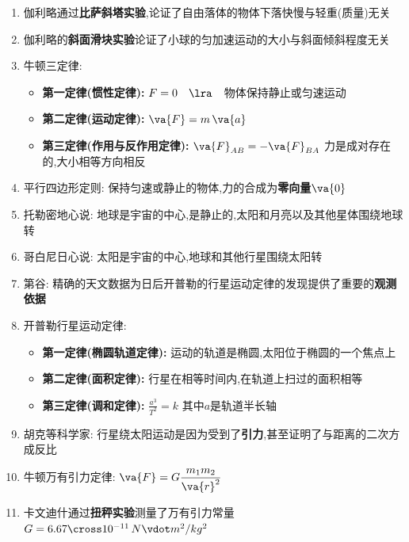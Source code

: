 \documentclass{article}
\begin{document}
\begin{itemize}
\begin{enumerate}
              \item 伽利略通过\textbf{比萨斜塔实验},论证了自由落体的物体下落快慢与轻重(质量)无关
              \item 伽利略的\textbf{斜面滑块实验}论证了小球的匀加速运动的大小与斜面倾斜程度无关
              \item 牛顿三定律:
                    \begin{itemize}
                        \item \textbf{第一定律(惯性定律):} $ F = 0 \quad \lra \quad $物体保持静止或匀速运动
                        \item \textbf{第二定律(运动定律):} $ \va{F} = m \, \va{a} $
                        \item \textbf{第三定律(作用与反作用定律):} $ \va{F}_{AB} = - \va{F}_{BA} $ 力是成对存在的,大小相等方向相反
                    \end{itemize}
              \item 平行四边形定则: 保持匀速或静止的物体,力的合成为\textbf{零向量$\va{0}$}
              \item 托勒密地心说: 地球是宇宙的中心,是静止的,太阳和月亮以及其他星体围绕地球转
              \item 哥白尼日心说: 太阳是宇宙的中心,地球和其他行星围绕太阳转
              \item 第谷: 精确的天文数据为日后开普勒的行星运动定律的发现提供了重要的\textbf{观测依据}
              \item 开普勒行星运动定律:
                    \begin{itemize}
                        \item \textbf{第一定律(椭圆轨道定律):} 运动的轨道是椭圆,太阳位于椭圆的一个焦点上
                        \item \textbf{第二定律(面积定律):} 行星在相等时间内,在轨道上扫过的面积相等
                        \item \textbf{第三定律(调和定律):} $ \frac{a^{3}}{T^{2}} = k $ 其中$a$是轨道半长轴
                    \end{itemize}
              \item 胡克等科学家: 行星绕太阳运动是因为受到了\textbf{引力},甚至证明了与距离的二次方成反比
              \item 牛顿万有引力定律: $ \va{F} = G\dfrac{m_{1}m_{2}}{\va{r}^{2}}$
              \item 卡文迪什通过\textbf{扭秤实验}测量了万有引力常量$G = 6.67 \cross 10^{-11} \, N \vdot m^{2}/kg^{2} $

                    \vspace{-1em}


\end{enumerate}
\end{itemize}
\end{document}
